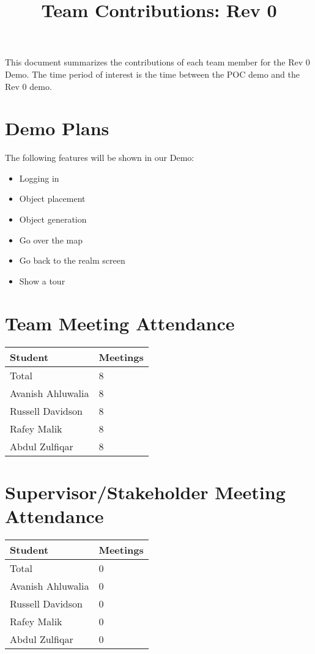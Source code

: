 \documentclass{article}
\title{Team Contributions: Rev 0\\\progname}
\author{\authname}
\date{}
\begin{document}
\maketitle

This document summarizes the contributions of each team member for the Rev 0
Demo.  The time period of interest is the time between the POC demo and the Rev
0 demo.

\section{Demo Plans}

The following features will be shown in our Demo:

\begin{itemize}
    \item Logging in
    \item Object placement
    \item Object generation
    \item Go over the map
    \item Go back to the realm screen
    \item Show a tour
\end{itemize}


\section{Team Meeting Attendance}


\begin{table}[H]
\centering
\begin{tabular}{ll}
\toprule
\textbf{Student} & \textbf{Meetings}\\
\midrule
Total & 8\\
Avanish Ahluwalia & 8\\
Russell Davidson & 8\\
Rafey Malik & 8\\
Abdul Zulfiqar & 8\\
\bottomrule
\end{tabular}
\end{table}


\section{Supervisor/Stakeholder Meeting Attendance}


\begin{table}[H]
\centering
\begin{tabular}{ll}
\toprule
\textbf{Student} & \textbf{Meetings}\\
\midrule
Total & 0\\
Avanish Ahluwalia & 0\\
Russell Davidson & 0\\
Rafey Malik & 0\\
Abdul Zulfiqar & 0\\
\bottomrule
\end{tabular}
\end{table}
\end{document}
